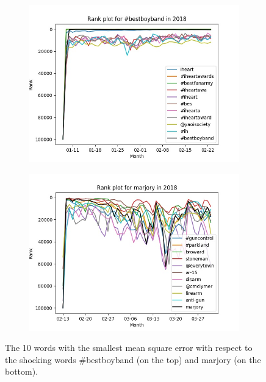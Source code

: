\documentclass{article}
\begin{document}
\begin{figure}
    \centering
    \begin{subfigure}{0.85\textwidth}
        \includegraphics[width=\textwidth]{bestboyband-2018-shock-event-comparison.jpg}
    \end{subfigure}

    \begin{subfigure}{0.85\textwidth}
        \includegraphics[width=\textwidth]{marjory-2018-shock-event-comparison.jpg}
    \end{subfigure}
    \caption{\label{Fig:GoodStory} The 10 words with the smallest mean square
error with respect to the shocking words \#bestboyband (on the top) and 
marjory (on the bottom).}
\end{figure}
\end{document}
